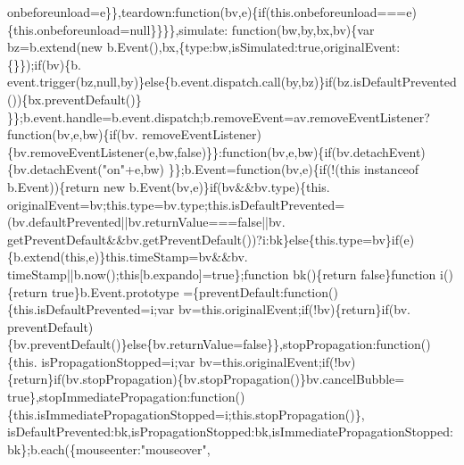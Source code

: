 \begin{DoxyCode}
      onbeforeunload=e\}\},teardown:\textcolor{keyword}{function}(bv,e)\{\textcolor{keywordflow}{if}(this.onbeforeunload===e)\{this.onbeforeunload=null\}\}\}\},simulate:\textcolor{keyword}{
      function}(bw,by,bx,bv)\{var bz=b.extend(\textcolor{keyword}{new} b.Event(),bx,\{type:bw,isSimulated:\textcolor{keyword}{true},originalEvent:\{\}\});\textcolor{keywordflow}{if}(bv)\{b.
      event.trigger(bz,null,by)\}\textcolor{keywordflow}{else}\{b.event.dispatch.call(by,bz)\}\textcolor{keywordflow}{if}(bz.isDefaultPrevented())\{bx.preventDefault()\}
      \}\};b.event.handle=b.event.dispatch;b.removeEvent=av.removeEventListener?\textcolor{keyword}{function}(bv,e,bw)\{\textcolor{keywordflow}{if}(bv.
      removeEventListener)\{bv.removeEventListener(e,bw,\textcolor{keyword}{false})\}\}:\textcolor{keyword}{function}(bv,e,bw)\{\textcolor{keywordflow}{if}(bv.detachEvent)\{bv.detachEvent(\textcolor{stringliteral}{"on"}+e,bw)
      \}\};b.Event=\textcolor{keyword}{function}(bv,e)\{\textcolor{keywordflow}{if}(!(\textcolor{keyword}{this} instanceof b.Event))\{\textcolor{keywordflow}{return} \textcolor{keyword}{new} b.Event(bv,e)\}\textcolor{keywordflow}{if}(bv&&bv.type)\{this.
      originalEvent=bv;this.type=bv.type;this.isDefaultPrevented=(bv.defaultPrevented||bv.returnValue===\textcolor{keyword}{false}||bv.
      getPreventDefault&&bv.getPreventDefault())?i:bk\}\textcolor{keywordflow}{else}\{this.type=bv\}\textcolor{keywordflow}{if}(e)\{b.extend(\textcolor{keyword}{this},e)\}this.timeStamp=bv&&bv.
      timeStamp||b.now();\textcolor{keyword}{this}[b.expando]=\textcolor{keyword}{true}\};\textcolor{keyword}{function} bk()\{\textcolor{keywordflow}{return} \textcolor{keyword}{false}\}\textcolor{keyword}{function} i()\{\textcolor{keywordflow}{return} \textcolor{keyword}{true}\}b.Event.prototype
      =\{preventDefault:\textcolor{keyword}{function}()\{this.isDefaultPrevented=i;var bv=this.originalEvent;\textcolor{keywordflow}{if}(!bv)\{\textcolor{keywordflow}{return}\}\textcolor{keywordflow}{if}(bv.
      preventDefault)\{bv.preventDefault()\}\textcolor{keywordflow}{else}\{bv.returnValue=\textcolor{keyword}{false}\}\},stopPropagation:\textcolor{keyword}{function}()\{this.
      isPropagationStopped=i;var bv=this.originalEvent;\textcolor{keywordflow}{if}(!bv)\{\textcolor{keywordflow}{return}\}\textcolor{keywordflow}{if}(bv.stopPropagation)\{bv.stopPropagation()\}bv.cancelBubble=\textcolor{keyword}{
      true}\},stopImmediatePropagation:\textcolor{keyword}{function}()\{this.isImmediatePropagationStopped=i;this.stopPropagation()\},
      isDefaultPrevented:bk,isPropagationStopped:bk,isImmediatePropagationStopped:bk\};b.each(\{mouseenter:\textcolor{stringliteral}{"mouseover"},

\end{DoxyCode}
